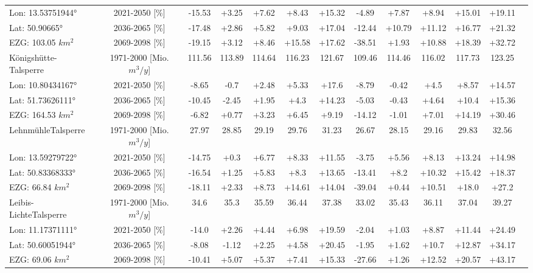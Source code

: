\begin{longtable}{@{\extracolsep{\fill}}lc|ccccc||cccccc}
\cline{2-13} 
Lon: 13.53751944° & 2021-2050 [\%]  & -15.53 & +3.25 & +7.62 & +8.43 & +15.32 & -4.89 & +7.87 & +8.94 & +15.01 & +19.11 & \\ 
Lat: 50.90665° & 2036-2065 [\%]  & -17.48 & +2.86 & +5.82 & +9.03 & +17.04 & -12.44 & +10.79 & +11.12 & +16.77 & +21.32 & \\ 
EZG: 103.05 $km^2$ & 2069-2098 [\%]  & -19.15 & +3.12 & +8.46 & +15.58 & +17.62 & -38.51 & +1.93 & +10.88 & +18.39 & +32.72 & \\ 
\hline 
Königshütte-Talsperre & 1971-2000 [Mio. $m^3/y$]  & 111.56 & 113.89 & 114.64 & 116.23 & 121.67 & 109.46 & 114.46 & 116.02 & 117.73 & 123.25 & \\ 
\cline{2-13} 
Lon: 10.80434167° & 2021-2050 [\%]  & -8.65 & -0.7 & +2.48 & +5.33 & +17.6 & -8.79 & -0.42 & +4.5 & +8.57 & +14.57 & \\ 
Lat: 51.73626111° & 2036-2065 [\%]  & -10.45 & -2.45 & +1.95 & +4.3 & +14.23 & -5.03 & -0.43 & +4.64 & +10.4 & +15.36 & \\ 
EZG: 164.53 $km^2$ & 2069-2098 [\%]  & -6.82 & +0.77 & +3.23 & +6.45 & +9.19 & -14.12 & -1.01 & +7.01 & +14.19 & +30.46 & \\ 
\hline 
LehnmühleTalsperre & 1971-2000 [Mio. $m^3/y$]  & 27.97 & 28.85 & 29.19 & 29.76 & 31.23 & 26.67 & 28.15 & 29.16 & 29.83 & 32.56 & \\ 
\cline{2-13} 
Lon: 13.59279722° & 2021-2050 [\%]  & -14.75 & +0.3 & +6.77 & +8.33 & +11.55 & -3.75 & +5.56 & +8.13 & +13.24 & +14.98 & \\ 
Lat: 50.83368333° & 2036-2065 [\%]  & -16.54 & +1.25 & +5.83 & +8.3 & +13.65 & -13.41 & +8.2 & +10.32 & +15.42 & +18.37 & \\ 
EZG: 66.84 $km^2$ & 2069-2098 [\%]  & -18.11 & +2.33 & +8.73 & +14.61 & +14.04 & -39.04 & +0.44 & +10.51 & +18.0 & +27.2 & \\ 
\hline 
Leibis-LichteTalsperre & 1971-2000 [Mio. $m^3/y$]  & 34.6 & 35.3 & 35.59 & 36.44 & 37.38 & 33.02 & 35.43 & 36.11 & 37.04 & 39.27 & \\ 
\cline{2-13} 
Lon: 11.17371111° & 2021-2050 [\%]  & -14.0 & +2.26 & +4.44 & +6.98 & +19.59 & -2.04 & +1.03 & +8.87 & +11.44 & +24.49 & \\ 
Lat: 50.60051944° & 2036-2065 [\%]  & -8.08 & -1.12 & +2.25 & +4.58 & +20.45 & -1.95 & +1.62 & +10.7 & +12.87 & +34.17 & \\ 
EZG: 69.06 $km^2$ & 2069-2098 [\%]  & -10.41 & +5.07 & +5.37 & +7.41 & +15.33 & -27.66 & +1.26 & +12.52 & +20.57 & +43.17 & \\ 

\end{longtable}
